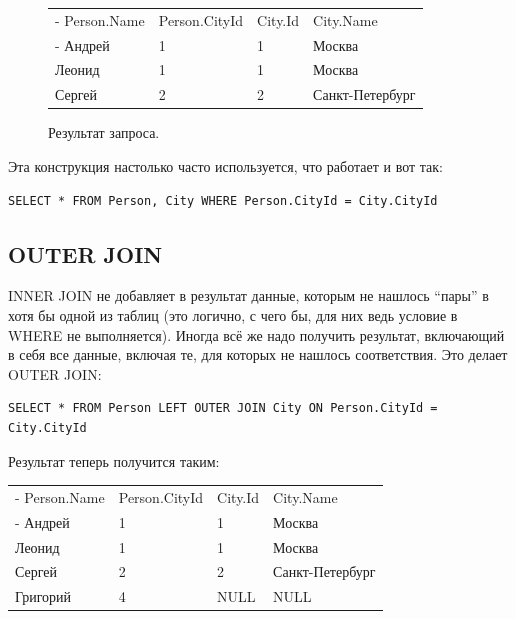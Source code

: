 \documentclass[a5paper]{article}
\begin{document}
\begin{figure}
	\begin{center}
		\begin{tabu}{| X[1 l p] | X[1 l p] | X[1 l p] | X[1 l p]  |}
			\tabucline-
			Person.Name  & Person.CityId  & City.Id  & City.Name       \\
			\tabucline-
			\everyrow{\tabucline-}
			Андрей       & 1              & 1        & Москва          \\
			Леонид       & 1              & 1        & Москва          \\
			Сергей       & 2              & 2        & Санкт-Петербург \\
		\end{tabu}
	\end{center}
	\caption{Результат запроса.}
	\label{table:citiesPeopleResult}
\end{figure}

Эта конструкция настолько часто используется, что работает и вот так:

\begin{verbatim}
SELECT * FROM Person, City WHERE Person.CityId = City.CityId
\end{verbatim}

\subsection{OUTER JOIN}

INNER JOIN не добавляет в результат данные, которым не нашлось ``пары'' в хотя бы одной из таблиц (это логично, с чего бы, для них ведь условие в WHERE не выполняется). Иногда всё же надо получить результат, включающий в себя все данные, включая те, для которых не нашлось соответствия. Это делает OUTER JOIN:

\begin{verbatim}
SELECT * FROM Person LEFT OUTER JOIN City ON Person.CityId = City.CityId
\end{verbatim}

Результат теперь получится таким:

\begin{center}
	\begin{tabu}{| X[1 l p] | X[1 l p] | X[1 l p] | X[1 l p] |}
		\tabucline-
		Person.Name  & Person.CityId  & City.Id  & City.Name       \\
		\tabucline-
		\everyrow{\tabucline-}
		Андрей       & 1              & 1        & Москва          \\
		Леонид       & 1              & 1        & Москва          \\
		Сергей       & 2              & 2        & Санкт-Петербург \\
		Григорий     & 4              & NULL     & NULL            \\
	\end{tabu}
\end{center}
\end{document}
